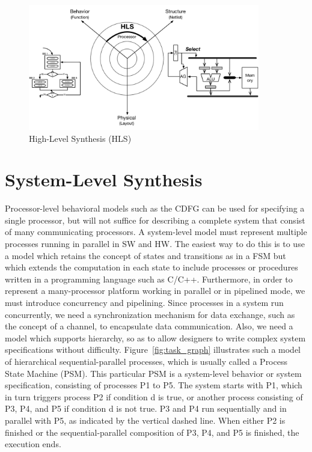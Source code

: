 \begin{figure}[h]
    \centering
    \includegraphics[width=0.9\textwidth]{figures/Introduction/processor-synthesis.pdf}
    \caption{High-Level Synthesis (HLS)}
    \label{fig:proc_synthesis}
\end{figure}


\section{System-Level Synthesis}

Processor-level behavioral models such as the CDFG can be used for specifying a single processor, but will not suffice for describing a complete system that consist of many communicating processors.
A system-level model must represent multiple processes running in parallel in SW and HW.
The easiest way to do this is to use a model which retains the concept of states and transitions as in a FSM but which extends the computation in each state to include processes or procedures written in a programming language such as C/C++.
Furthermore, in order to represent a many-processor platform working in parallel or in pipelined mode, we must introduce concurrency and pipelining.
Since processes in a system run concurrently, we need a synchronization mechanism for data exchange, such as the concept of a channel, to encapsulate data communication.
Also, we need a model which supports hierarchy, so as to allow designers to write complex system specifications without difficulty.
Figure~\ref{fig:task_graph} illustrates such a model of hierarchical sequential-parallel processes, which is
usually called a Process State Machine (PSM).
This particular PSM is a system-level behavior or system specification, consisting of processes P1 to P5.
The
system starts with P1, which in turn triggers process P2 if condition d is true, or
another process consisting of P3, P4, and P5 if condition d is not true. P3 and
P4 run sequentially and in parallel with P5, as indicated by the vertical dashed
line. When either P2 is finished or the sequential-parallel composition of P3,
P4, and P5 is finished, the execution ends.

